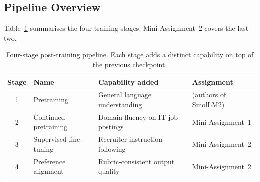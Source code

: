 \documentclass[../main.tex]{subfiles}
\begin{document}
\subsection{Pipeline Overview}
\label{sec:pipeline_overview}

Table~\ref{tab:pipeline} summarises the four training stages. Mini-Assignment~2 covers the last two.

\begin{table}[h]
\centering
\small
\begin{tabular}{clll}
\toprule
\textbf{Stage} & \textbf{Name} & \textbf{Capability added} & \textbf{Assignment} \\
\midrule
1 & Pretraining          & General language understanding         & (authors of SmolLM2) \\
2 & Continued pretraining & Domain fluency on IT job postings     & Mini-Assignment~1 \\
3 & Supervised fine-tuning & Recruiter instruction following       & Mini-Assignment~2 \\
4 & Preference alignment  & Rubric-consistent output quality       & Mini-Assignment~2 \\
\bottomrule
\end{tabular}
\caption{Four-stage post-training pipeline. Each stage adds a distinct capability on top of the previous checkpoint.}
\label{tab:pipeline}
\end{table}
\end{document}

